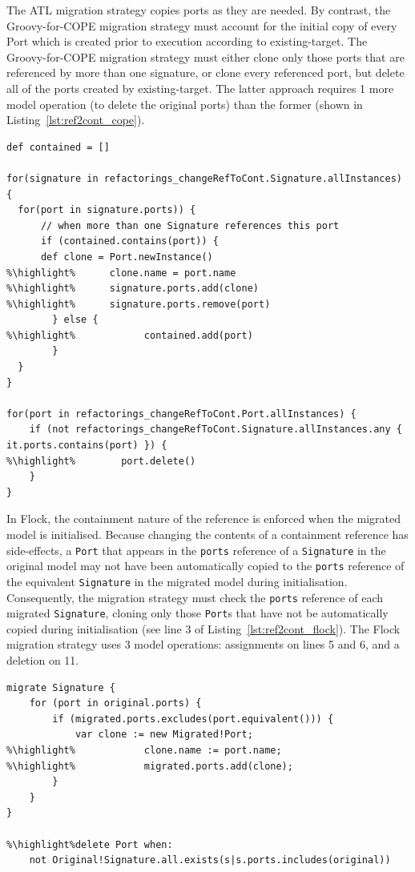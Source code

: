 The ATL migration strategy copies ports as they are needed. By contrast, the Groovy-for-COPE migration strategy must account for the initial copy of every Port which is created prior to execution according to existing-target. The Groovy-for-COPE migration strategy must either clone only those ports that are referenced by more than one signature, or clone every referenced port, but delete all of the ports created by existing-target. The latter approach requires 1 more model operation (to delete the original ports) than the former (shown in Listing~\ref{lst:ref2cont_cope}).

\begin{lstlisting}[float=tbp, caption=Migration for Change Reference to Containment in Groovy-for-COPE, label=lst:ref2cont_cope, language=COPE, tabsize=2]
def contained = []

for(signature in refactorings_changeRefToCont.Signature.allInstances) {
  for(port in signature.ports)) {
	  // when more than one Signature references this port
	  if (contained.contains(port)) {
      def clone = Port.newInstance()
%\highlight%      clone.name = port.name
%\highlight%      signature.ports.add(clone)
%\highlight%      signature.ports.remove(port)
		} else {
%\highlight%			contained.add(port)
		}
  }
}

for(port in refactorings_changeRefToCont.Port.allInstances) {
	if (not refactorings_changeRefToCont.Signature.allInstances.any { it.ports.contains(port) }) {
%\highlight%	  	port.delete()
	}
}
\end{lstlisting}

In Flock, the containment nature of the reference is enforced when the migrated model is initialised. Because changing the contents of a containment reference has side-effects, a \texttt{Port} that appears in the \texttt{ports} reference of a \texttt{Signature} in the original model may not have been automatically copied to the \texttt{ports} reference of the equivalent \texttt{Signature} in the migrated model during initialisation. Consequently, the migration strategy must check the \texttt{ports} reference of each migrated \texttt{Signature}, cloning only those \texttt{Port}s that have not be automatically copied during initialisation (see line 3 of Listing~\ref{lst:ref2cont_flock}). The Flock migration strategy uses 3 model operations: assignments on lines 5 and 6, and a deletion on 11.

\begin{lstlisting}[float=tbp, caption=Migration for Change Reference to Containment in Flock, label=lst:ref2cont_flock, language=Flock, tabsize=2]
migrate Signature {
	for (port in original.ports) {
		if (migrated.ports.excludes(port.equivalent())) {
			var clone := new Migrated!Port;
%\highlight%			clone.name := port.name;
%\highlight%			migrated.ports.add(clone);
		}
	}
}

%\highlight%delete Port when:
	not Original!Signature.all.exists(s|s.ports.includes(original))
\end{lstlisting}


